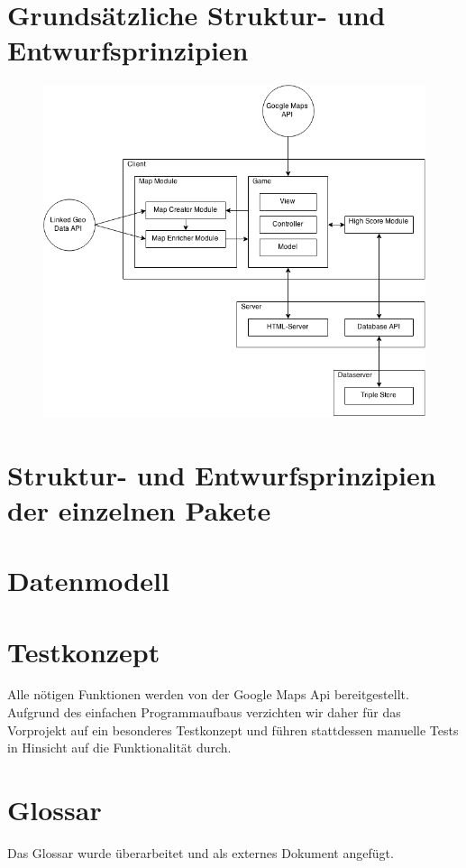 \documentclass[11pt,a4paper]{article}
\begin{document}
\section{Grundsätzliche Struktur- und Entwurfsprinzipien}

\begin{figure}[htb]
  \centering
  \includegraphics[scale=0.5]{arch.png}
  \label{PNFs}
\end{figure} 
\section{Struktur- und Entwurfsprinzipien der einzelnen Pakete}
\section{Datenmodell}
 
\section{Testkonzept}
Alle nötigen Funktionen werden von der Google Maps Api bereitgestellt.
Aufgrund des einfachen Programmaufbaus verzichten wir daher für das Vorprojekt auf ein besonderes Testkonzept und führen stattdessen manuelle Tests in Hinsicht auf die Funktionalität durch.
\section{Glossar}
Das Glossar wurde überarbeitet und als externes Dokument angefügt.
\end{document}
